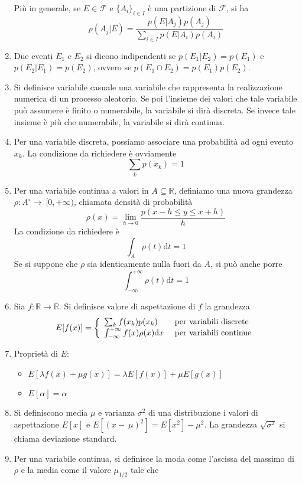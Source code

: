 \documentclass[a4paper,11pt]{article}
\begin{document}
\begin{enumerate}[resume]
	\noindent Più in generale, se $E\in\mathcal{F}$ e $\{A_i\}_{i\in I}$ è una partizione di $\mathcal{F}$, si ha
	\[p(A_j|E)=\frac{p(E|A_j)p(A_j)}{\sum_{i\in I}p(E|A_i)p(A_i)}\]
	\item Due eventi $E_1$ e $E_2$ si dicono indipendenti se $p(E_1|E_2)=p(E_1)$ e $p(E_2|E_1)=p(E_2)$, ovvero se $p(E_1\cap E_2)=p(E_1)p(E_2)$.
	\item Si definisce variabile casuale una variabile che rappresenta la realizzazione numerica di un processo aleatorio. Se poi l'insieme dei valori che tale variabile può assumere è finito o numerabile, la variabile si dirà discreta. Se invece tale insieme è più che numerabile, la variabile si dirà continua.
	\item Per una variabile discreta, possiamo associare una probabilità ad ogni evento $x_k$. La condizione da richiedere è ovviamente
	\[\sum_{k}p(x_k)=1\]
	\item Per una variabile continua a valori in $A\subseteq\mathbb{R}$, definiamo una nuova grandezza $\rho\colon A^\circ\to~[0,+\infty)$, chiamata densità di probabilità
	\[\rho(x)=\lim\limits_{h\to0}\frac{p(x-h\leq y \leq x+h)}{h}\]
	La condizione da richiedere è 
	\[\int_{A}\rho(t)\mathrm{d}t=1\]
	Se si suppone che $\rho$ sia identicamente nulla fuori da $\overline{A}$, si può anche porre
	\[\int_{-\infty}^{+\infty}\rho(t)\mathrm{d}t=1\]
	\item Sia $f\colon\mathbb{R}\to\mathbb{R}$. Si definisce valore di aspettazione di $f$ la grandezza
	\[E[f(x)]=\left\{\begin{array}{l l}
	\sum_{k}f(x_k)p(x_k) & \textrm{ per variabili discrete} \\
	\int_{-\infty}^{+\infty}f(x)\rho(x)\mathrm{d}x & \textrm{ per variabili continue} \\
	\end{array}\right.\]
	\item Proprietà di $E$:
	\begin{itemize}
		\item $E[\lambda f(x)+\mu g(x)]=\lambda E[f(x)]+\mu E[g(x)]$
		\item $E[\alpha]=\alpha$
	\end{itemize}
	\item Si definiscono media $\mu$ e varianza $\sigma^2$ di una distribuzione i valori di aspettazione $E[x]$ e $E[(x-~\mu)^2]=E[x^2]-\mu^2$. La grandezza $\sqrt{\sigma^2}$ si chiama deviazione standard.
	\item Per una variabile continua, si definisce la moda come l'ascissa del massimo di $\rho$ e la media come il valore $\mu_{1/2}$ tale che

\end{enumerate}
\end{document}
